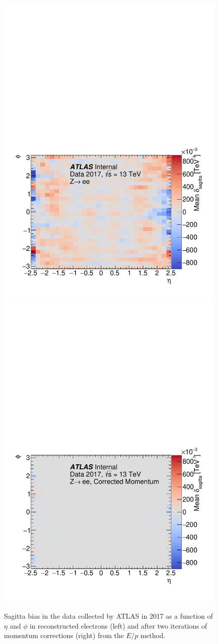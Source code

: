 \begin{figure}[htbp]
  \centering
  \includegraphics[width=.48\textwidth]{figs/alignment/eop/sagitta_2017}
  \includegraphics[width=.48\textwidth]{figs/alignment/eop/sagitta_2017_Iter2}
  \caption{Sagitta bias in the  data collected by ATLAS in 2017 as a function of $\eta$ and $\phi$ in reconstructed electrons (left) and after two iterations of momentum corrections (right) from the $E/p$ method.}
  \label{fig:alignment_2017_sagitta_map}
\end{figure}

